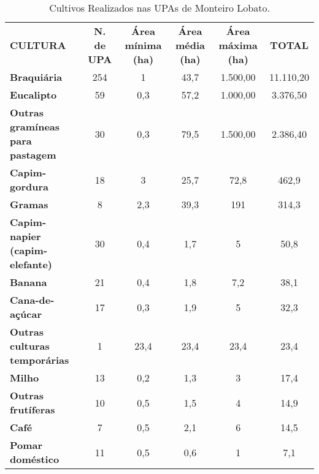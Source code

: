 \begin{table}[htbp]
  \centering
  \caption{Cultivos Realizados nas UPAs de Monteiro Lobato.}
    \begin{tabular}{p{14.5em}|c|c|c|c|c}
    \rowcolor[rgb]{ .969,  .588,  .275} \textcolor[rgb]{ 1,  1,  1}{\textbf{CULTURA}} & \multicolumn{1}{P{4.215em}|}{\textcolor[rgb]{ 1,  1,  1}{\textbf{N. de UPA}}} & \multicolumn{1}{P{4.215em}|}{\textcolor[rgb]{ 1,  1,  1}{\textbf{Área mínima (ha)}}} & \multicolumn{1}{P{4.215em}|}{\textcolor[rgb]{ 1,  1,  1}{\textbf{Área média (ha)}}} & \multicolumn{1}{P{5.07em}|}{\textcolor[rgb]{ 1,  1,  1}{\textbf{Área máxima (ha)}}} & \multicolumn{1}{P{5.43em}}{\textcolor[rgb]{ 1,  1,  1}{\textbf{TOTAL}}} \\
    \rowcolor[rgb]{ .984,  .831,  .706} \textbf{Braquiária} & 254   & 1     & 43,7  & 1.500,00 & 11.110,20 \\
    \rowcolor[rgb]{ .992,  .914,  .851} \textbf{Eucalipto} & 59    & 0,3   & 57,2  & 1.000,00 & 3.376,50 \\
    \rowcolor[rgb]{ .984,  .831,  .706} \textbf{Outras gramíneas para pastagem} & 30    & 0,3   & 79,5  & 1.500,00 & 2.386,40 \\
    \rowcolor[rgb]{ .992,  .914,  .851} \textbf{Capim-gordura} & 18    & 3     & 25,7  & 72,8  & 462,9 \\
    \rowcolor[rgb]{ .984,  .831,  .706} \textbf{Gramas} & 8     & 2,3   & 39,3  & 191   & 314,3 \\
    \rowcolor[rgb]{ .992,  .914,  .851} \textbf{Capim-napier (capim-elefante)} & 30    & 0,4   & 1,7   & 5     & 50,8 \\
    \rowcolor[rgb]{ .984,  .831,  .706} \textbf{Banana} & 21    & 0,4   & 1,8   & 7,2   & 38,1 \\
    \rowcolor[rgb]{ .992,  .914,  .851} \textbf{Cana-de-açúcar} & 17    & 0,3   & 1,9   & 5     & 32,3 \\
    \rowcolor[rgb]{ .984,  .831,  .706} \textbf{Outras culturas temporárias} & 1     & 23,4  & 23,4  & 23,4  & 23,4 \\
    \rowcolor[rgb]{ .992,  .914,  .851} \textbf{Milho} & 13    & 0,2   & 1,3   & 3     & 17,4 \\
    \rowcolor[rgb]{ .984,  .831,  .706} \textbf{Outras frutíferas} & 10    & 0,5   & 1,5   & 4     & 14,9 \\
    \rowcolor[rgb]{ .992,  .914,  .851} \textbf{Café} & 7     & 0,5   & 2,1   & 6     & 14,5 \\
    \rowcolor[rgb]{ .984,  .831,  .706} \textbf{Pomar doméstico} & 11    & 0,5   & 0,6   & 1     & 7,1 \\

\end{tabular}
\end{table}
